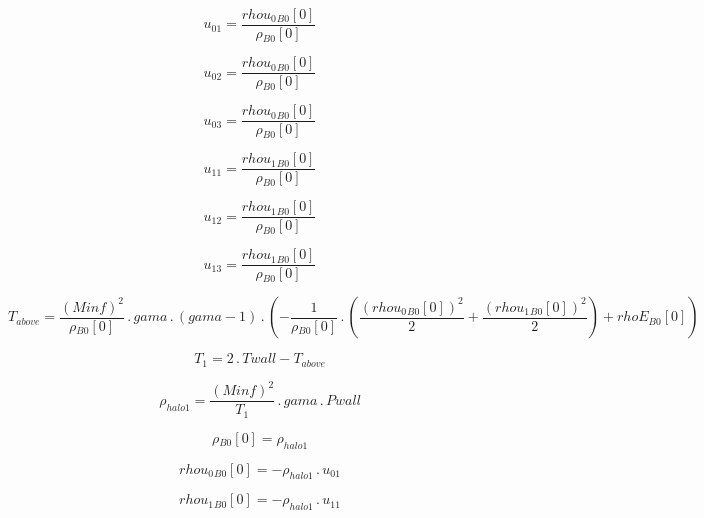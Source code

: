 \documentclass{article}
\begin{document}
\begin{dmath}u_{01} = \frac{{rhou_{0}{_{B0}}}[{0}]}{{\rho{_{B0}}}[{0}]}\end{dmath}

\begin{dmath}u_{02} = \frac{{rhou_{0}{_{B0}}}[{0}]}{{\rho{_{B0}}}[{0}]}\end{dmath}

\begin{dmath}u_{03} = \frac{{rhou_{0}{_{B0}}}[{0}]}{{\rho{_{B0}}}[{0}]}\end{dmath}

\begin{dmath}u_{11} = \frac{{rhou_{1}{_{B0}}}[{0}]}{{\rho{_{B0}}}[{0}]}\end{dmath}

\begin{dmath}u_{12} = \frac{{rhou_{1}{_{B0}}}[{0}]}{{\rho{_{B0}}}[{0}]}\end{dmath}

\begin{dmath}u_{13} = \frac{{rhou_{1}{_{B0}}}[{0}]}{{\rho{_{B0}}}[{0}]}\end{dmath}

\begin{dmath}T_{above} = \frac{\left(Minf \right)^{2}}{{\rho{_{B0}}}[{0}]} \,.\, gama \,.\, \left(gama - 1\right) \,.\, \left(- \frac{1}{{\rho{_{B0}}}[{0}]} \,.\, \left(\frac{\left({rhou_{0}{_{B0}}}[{0}] \right)^{2}}{2} + 
\frac{\left({rhou_{1}{_{B0}}}[{0}] \right)^{2}}{2}\right) + {rhoE{_{B0}}}[{0}]\right)\end{dmath}

\begin{dmath}T_{1} = 2 \,.\, Twall - T_{above}\end{dmath}

\begin{dmath}\rho_{halo 1} = \frac{\left(Minf \right)^{2}}{T_{1}} \,.\, gama \,.\, Pwall\end{dmath}

\begin{dmath}{\rho{_{B0}}}[{0}] = \rho_{halo 1}\end{dmath}

\begin{dmath}{rhou_{0}{_{B0}}}[{0}] = - \rho_{halo 1} \,.\, u_{01}\end{dmath}

\begin{dmath}{rhou_{1}{_{B0}}}[{0}] = - \rho_{halo 1} \,.\, u_{11}\end{dmath}
\end{document}
